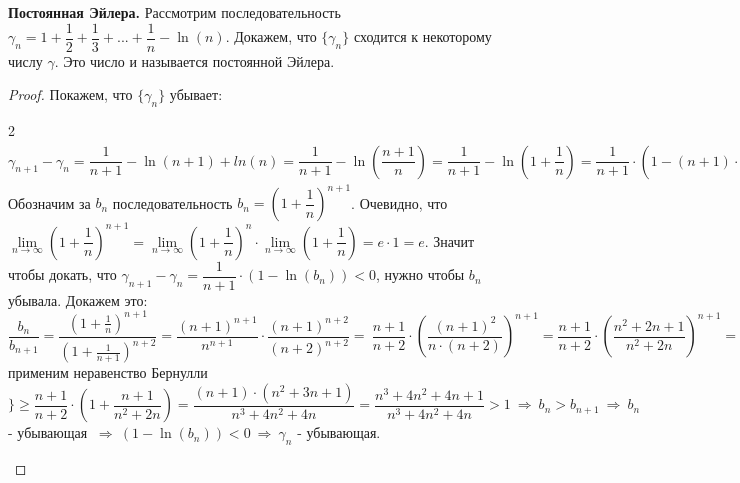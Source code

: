 \documentclass[12pt]{article}
\begin{document}
 \textbf{Постоянная Эйлера.} Рассмотрим последовательность $\gamma_n = 1 + \dfrac12 + \dfrac13 + ... + \dfrac1n - \ln(n)$. Докажем, что $\{\gamma_n\}$ сходится к некоторому числу $\gamma$. Это число и называется постоянной Эйлера. 
 \begin{proof}
     Покажем, что $\{\gamma_n\}$ убывает: 
     \begin{spacing}{2}
         $\gamma_{n+1} - \gamma_n = \dfrac{1}{n+1} - \ln(n+1) + ln(n) = \dfrac{1}{n+1} - \ln\left(\dfrac{n+1}{n} \right) = \dfrac{1}{n+1} - \ln\left(1 +\dfrac{1}{n}\right) = \dfrac{1}{n+1} \cdot \left(1 - (n+1) \cdot \ln\left(1 +\dfrac{1}{n}\right)\right) =  \dfrac{1}{n+1} \cdot \left(1 - \ln\left(1 +\dfrac{1}{n}\right)^{n+1}\right)$ \\
     Обозначим за $b_n$ последовательность $b_n = \left( 1 + \dfrac1n\right)^{n+1}$. Очевидно, что $\lim\limits_{n \to \infty} \left( 1 + \dfrac1n\right)^{n+1} = \lim\limits_{n \to \infty} \left( 1 + \dfrac1n\right)^{n} \cdot \lim\limits_{n \to \infty} \left( 1 + \dfrac1n\right) = e \cdot 1 = e$. Значит чтобы докать, что $\gamma_{n+1} - \gamma_n = \dfrac1{n+1} \cdot \left( 1 - \ln\left(b_n\right)\right) < 0$, нужно чтобы $b_n$ убывала. Докажем это: \\ 
     $\dfrac{b_n}{b_{n+1}} = \dfrac{\left( 1 + \frac1n\right)^{n+1}}{\left( 1 + \frac1{n+1}\right)^{n+2}} = \dfrac{(n+1)^{n+1}}{n^{n+1}} \cdot \dfrac{\left(n+1\right)^{n+2}}{\left(n+2\right)^{n+2}} 
     = \ \dfrac{n+1}{n+2} \cdot \left( \dfrac{\left(n+1\right)^2}{n \cdot (n+2)} \right)^{n+1} 
     = \dfrac{n+1}{n+2} \cdot \left( \dfrac{n^2 + 2n + 1}{n^2 + 2n} \right)^{n+1} 
     = \dfrac{n+1}{n+2} \cdot \left(1 +  \dfrac{1}{n^2 + 2n} \right)^{n+1} 
     \geq \{$применим неравенство Бернулли$\} 
     \geq \dfrac{n+1}{n+2} \cdot \left(1 +  \dfrac{n+1}{n^2 + 2n} \right) 
     = \dfrac{(n+1) \cdot (n^2+3n+1)}{n^3+4n^2+4n} 
     = \dfrac{n^3+4n^2+4n+1}{n^3+4n^2+4n} > 1 \ \Rightarrow \ b_n > b_{n+1} \ \Rightarrow \ b_n$ - убывающая $\ \Rightarrow \ \left(1 - \ln(b_n)\right) < 0 \ \Rightarrow \ \gamma_n$ - убывающая.
     \end{spacing}
     

\end{proof}
\end{document}
